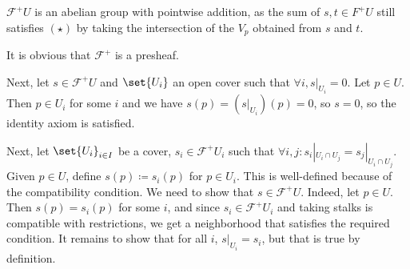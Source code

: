 $\mathcal{F}^+U$ is an abelian group with pointwise addition, as the sum
of $s, t \in F^+U$ still satisfies $(\star)$ by taking the intersection of the
$V_p$ obtained from $s$ and $t$.

It is obvious that $\mathcal{F}^+$ is a presheaf.

Next, let $s \in \mathcal{F}^+U$ and $\set{U_i}$ an open cover such that
 $\forall i, s|_{U_i} = 0$. Let $p \in U$.  Then $p \in U_i$ for some $i$ and
 we have $s(p) = (s|_{U_i})(p) = 0$, so $s = 0$, so the identity axiom is satisfied.

Next, let $\set{U_i}_{i \in I}$ be a cover, $s_i \in \mathcal{F}^+U_i$ such that
$\forall i, j\colon s_i|_{U_i\cap U_j} = s_j|_{U_i\cap U_j}$. Given $p \in U$,
define $s(p)\coloneqq s_i(p)$ for $p \in U_i$. This is well-defined because of
the compatibility condition. We need to show that $s \in \mathcal{F}^+U$. Indeed,
let $p \in U$. Then $s(p) = s_i(p)$ for some $i$, and since $s_i \in \mathcal{F}^+U_i$
and taking stalks is compatible with restrictions, we get a neighborhood that
satisfies the required condition.
It remains to show that for all $i$, $s|_{U_i} = s_i$, but that is true by
definition.
